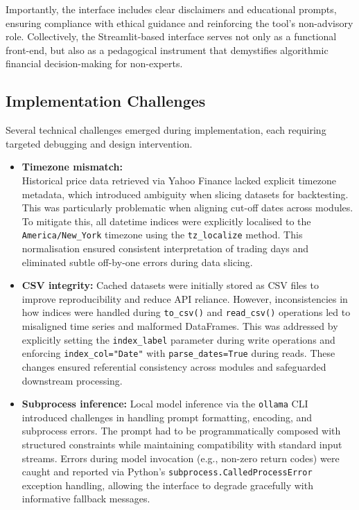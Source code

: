 Importantly, the interface includes clear disclaimers and educational prompts, ensuring compliance with ethical guidance and reinforcing the tool’s non-advisory role. Collectively, the Streamlit-based interface serves not only as a functional front-end, but also as a pedagogical instrument that demystifies algorithmic financial decision-making for non-experts.

\subsection{Implementation Challenges}

Several technical challenges emerged during implementation, each requiring targeted debugging and design intervention.

\begin{itemize}

\item \textbf{Timezone mismatch:}\\
Historical price data retrieved via Yahoo Finance lacked explicit timezone metadata, which introduced ambiguity when slicing datasets for backtesting. This was particularly problematic when aligning cut-off dates across modules. To mitigate this, all datetime indices were explicitly localised to the \texttt{America/New\_York} timezone using the \texttt{tz\_localize} method. This normalisation ensured consistent interpretation of trading days and eliminated subtle off-by-one errors during data slicing.

\item \textbf{CSV integrity:}
Cached datasets were initially stored as CSV files to improve reproducibility and reduce API reliance. However, inconsistencies in how indices were handled during \texttt{to\_csv()} and \texttt{read\_csv()} operations led to misaligned time series and malformed DataFrames. This was addressed by explicitly setting the \texttt{index\_label} parameter during write operations and enforcing \texttt{index\_col="Date"} with \texttt{parse\_dates=True} during reads. These changes ensured referential consistency across modules and safeguarded downstream processing.

\item \textbf{Subprocess inference:}
Local model inference via the \texttt{ollama} CLI introduced challenges in handling prompt formatting, encoding, and subprocess errors. The prompt had to be programmatically composed with structured constraints while maintaining compatibility with standard input streams. Errors during model invocation (e.g., non-zero return codes) were caught and reported via Python’s \texttt{subprocess.CalledProcessError} exception handling, allowing the interface to degrade gracefully with informative fallback messages.


\end{itemize}
